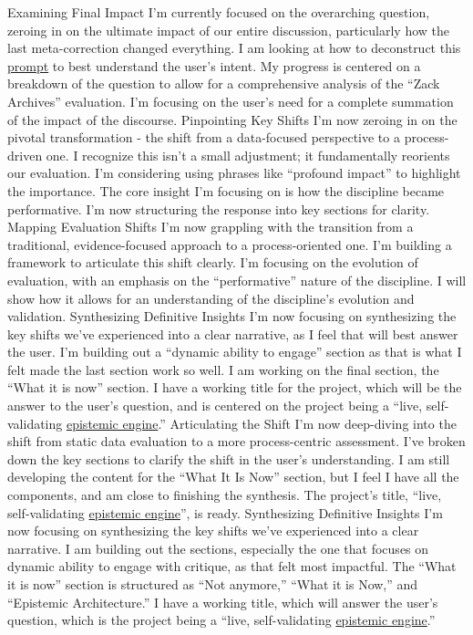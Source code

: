 \documentclass{article}
\begin{document}
Examining Final Impact I'm currently focused on the overarching question, zeroing in on the ultimate impact of our entire discussion, particularly how the last meta-correction changed everything. I am looking at how to deconstruct this \hyperlink{gloss:prompt}{prompt} to best understand the user's intent. My progress is centered on a breakdown of the question to allow for a comprehensive analysis of the ``Zack Archives'' evaluation. I'm focusing on the user's need for a complete summation of the impact of the discourse. Pinpointing Key Shifts I'm now zeroing in on the pivotal transformation - the shift from a data-focused perspective to a process-driven one. I recognize this isn't a small adjustment; it fundamentally reorients our evaluation. I'm considering using phrases like ``profound impact'' to highlight the importance. The core insight I'm focusing on is how the discipline became performative. I'm now structuring the response into key sections for clarity. Mapping Evaluation Shifts I'm now grappling with the transition from a traditional, evidence-focused approach to a process-oriented one. I'm building a framework to articulate this shift clearly. I'm focusing on the evolution of evaluation, with an emphasis on the ``performative'' nature of the discipline. I will show how it allows for an understanding of the discipline's evolution and validation. Synthesizing Definitive Insights I'm now focusing on synthesizing the key shifts we've experienced into a clear narrative, as I feel that will best answer the user. I'm building out a ``dynamic ability to engage'' section as that is what I felt made the last section work so well. I am working on the final section, the ``What it is now'' section. I have a working title for the project, which will be the answer to the user's question, and is centered on the project being a ``live, self-validating \hyperlink{gloss:epistemic_engine}{epistemic engine}.'' Articulating the Shift I'm now deep-diving into the shift from static data evaluation to a more process-centric assessment. I've broken down the key sections to clarify the shift in the user's understanding. I am still developing the content for the ``What It Is Now'' section, but I feel I have all the components, and am close to finishing the synthesis. The project's title, ``live, self-validating \hyperlink{gloss:epistemic_engine}{epistemic engine}'', is ready. Synthesizing Definitive Insights I'm now focusing on synthesizing the key shifts we've experienced into a clear narrative. I am building out the sections, especially the one that focuses on dynamic ability to engage with critique, as that felt most impactful. The ``What it is now'' section is structured as ``Not anymore,'' ``What it is Now,'' and ``Epistemic Architecture.'' I have a working title, which will answer the user's question, which is the project being a ``live, self-validating \hyperlink{gloss:epistemic_engine}{epistemic engine}.''
\end{document}
